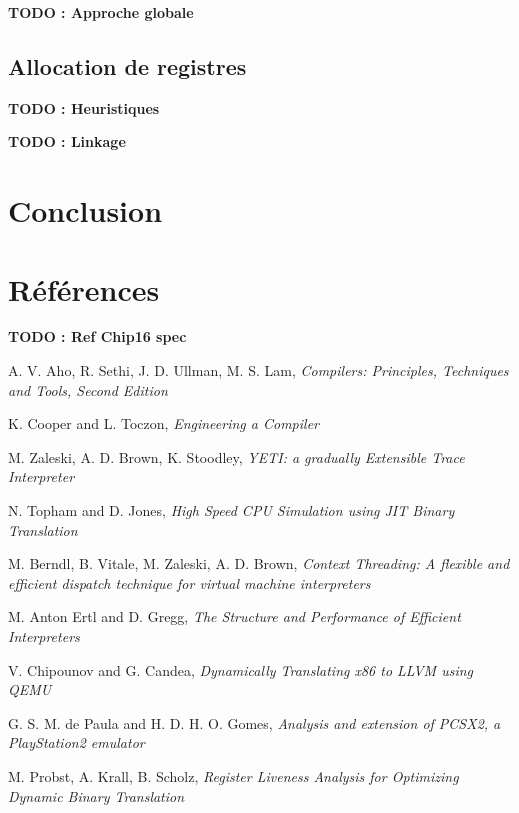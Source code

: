 \documentclass{article} %
\begin{document}
\textbf{TODO : Approche globale}

\subsection{Allocation de registres}

\textbf{TODO : Heuristiques}

\textbf{TODO : Linkage}

\section{Conclusion}

\section{Références}
\textbf{TODO : Ref Chip16 spec}

A. V. Aho, R. Sethi, J. D. Ullman, M. S. Lam, \textit{Compilers: Principles, Techniques and Tools, Second Edition}

K. Cooper and L. Toczon, \textit{Engineering a Compiler}

M. Zaleski, A. D. Brown, K. Stoodley, \textit{YETI: a gradually Extensible Trace Interpreter}

N. Topham and D. Jones, \textit{High Speed CPU Simulation using JIT Binary Translation}

M. Berndl, B. Vitale, M. Zaleski, A. D. Brown, \textit{Context Threading: A flexible and efficient dispatch technique for virtual machine interpreters}

M. Anton Ertl and D. Gregg, \textit{The Structure and Performance of Efficient Interpreters}

V. Chipounov and G. Candea, \textit{Dynamically Translating x86 to LLVM using QEMU}

G. S. M. de Paula and H. D. H. O. Gomes, \textit{Analysis and extension of PCSX2, a PlayStation2 emulator}

M. Probst, A. Krall, B. Scholz, \textit{Register Liveness Analysis for Optimizing Dynamic Binary Translation}
\end{document}
